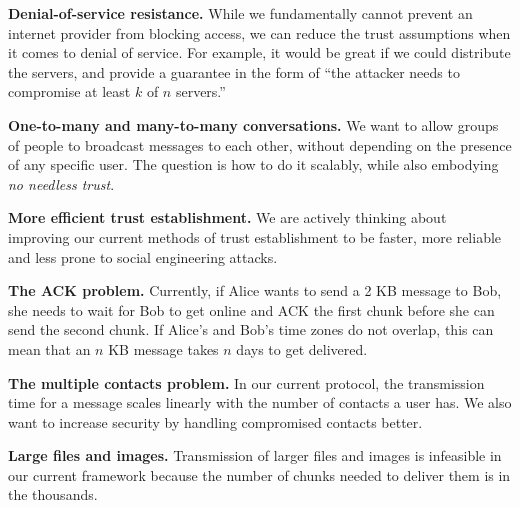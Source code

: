 \textbf{Denial-of-service resistance.} While we fundamentally cannot prevent an internet provider from blocking access, we can reduce the trust assumptions when it comes to denial of service. For example, it would be great if we could distribute the servers, and provide a guarantee in the form of ``the attacker needs to compromise at least $k$ of $n$ servers.''

\textbf{One-to-many and many-to-many conversations.} We want to allow groups of people to broadcast messages to each other, without depending on the presence of any specific user. The question is how to do it scalably, while also embodying \textit{no needless trust}.

\textbf{More efficient trust establishment.} We are actively thinking about improving our current methods of trust establishment to be faster, more reliable and less prone to social engineering attacks.

\textbf{The ACK problem.} Currently, if Alice wants to send a 2 KB message to Bob, she needs to wait for Bob to get online and ACK the first chunk before she can send the second chunk. If Alice's and Bob's time zones do not overlap, this can mean that an $n$ KB message takes $n$ days to get delivered.

\textbf{The multiple contacts problem.} In our current protocol, the transmission time for a message scales linearly with the number of contacts a user has. We also want to increase security by handling compromised contacts better.

\textbf{Large files and images.} Transmission of larger files and images is infeasible in our current framework because the number of chunks needed to deliver them is in the thousands.
